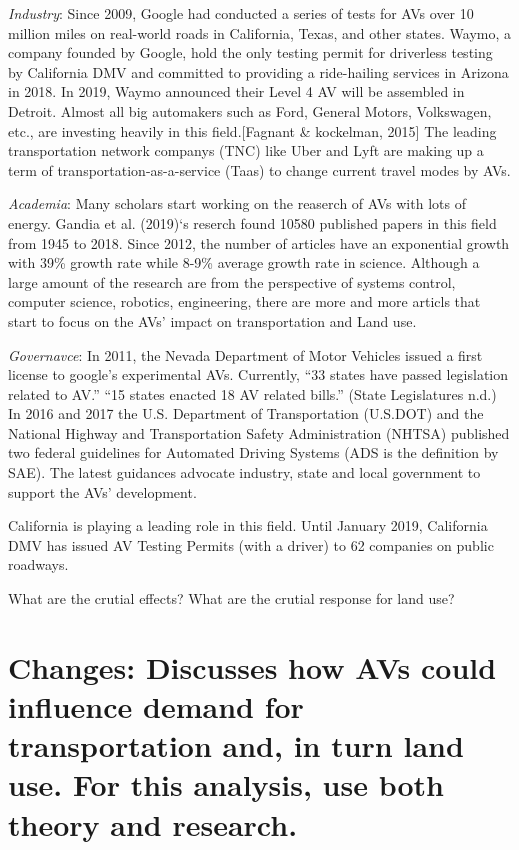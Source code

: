 \documentclass[12pt,]{article}
\begin{document}
\emph{Industry}: Since 2009, Google had conducted a series of tests for
AVs over 10 million miles on real-world roads in California, Texas, and
other states. Waymo, a company founded by Google, hold the only testing
permit for driverless testing by California DMV and committed to
providing a ride-hailing services in Arizona in 2018. In 2019, Waymo
announced their Level 4 AV will be assembled in Detroit. Almost all big
automakers such as Ford, General Motors, Volkswagen, etc., are investing
heavily in this field.{[}Fagnant \& kockelman, 2015{]} The leading
transportation network companys (TNC) like Uber and Lyft are making up a
term of transportation-as-a-service (Taas) to change current travel
modes by AVs.

\emph{Academia}: Many scholars start working on the reaserch of AVs with
lots of energy. Gandia et al. (2019)`s reserch found 10580 published
papers in this field from 1945 to 2018. Since 2012, the number of
articles have an exponential growth with 39\% growth rate while 8-9\%
average growth rate in science. Although a large amount of the research
are from the perspective of systems control, computer science, robotics,
engineering, there are more and more articls that start to focus on the
AVs' impact on transportation and Land use.

\emph{Governavce}: In 2011, the Nevada Department of Motor Vehicles
issued a first license to google's experimental AVs. Currently, ``33
states have passed legislation related to AV.'' ``15 states enacted 18
AV related bills.'' (State Legislatures n.d.) In 2016 and 2017 the U.S.
Department of Transportation (U.S.DOT) and the National Highway and
Transportation Safety Administration (NHTSA) published two federal
guidelines for Automated Driving Systems (ADS is the definition by SAE).
The latest guidances advocate industry, state and local government to
support the AVs' development.

California is playing a leading role in this field. Until January 2019,
California DMV has issued AV Testing Permits (with a driver) to 62
companies on public roadways.

What are the crutial effects? What are the crutial response for land
use?

\hypertarget{changes-discusses-how-avs-could-influence-demand-for-transportation-and-in-turn-land-use.-for-this-analysis-use-both-theory-and-research.}{%
\section{Changes: Discusses how AVs could influence demand for
transportation and, in turn land use. For this analysis, use both theory
and
research.}\label{changes-discusses-how-avs-could-influence-demand-for-transportation-and-in-turn-land-use.-for-this-analysis-use-both-theory-and-research.}}
\end{document}
